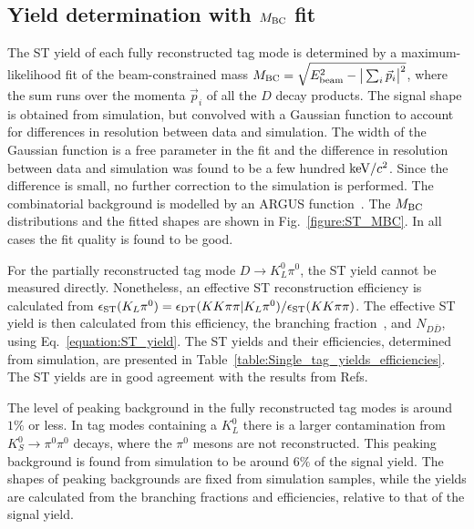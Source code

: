 \documentclass[12pt, a4paper, notitlepage, onecolumn]{article}
\begin{document}
\subsection{Yield determination with $M_{\rm BC}$ fit}
\noindent The ST yield of each fully reconstructed tag mode is determined by a maximum-likelihood fit of the beam-constrained mass $M_{\rm BC} = \sqrt{E_{\rm beam}^2 - \big\lvert\sum_i\vec{p}_i\big\rvert^2}$, where the sum runs over the momenta $\vec{p}_i$ of all the $D$ decay products. The signal shape is obtained from simulation, but convolved with a Gaussian function to account for differences in resolution between data and simulation. The width of the Gaussian function is a free parameter in the fit and the difference in resolution between data and simulation was found to be a few hundred ${\rm keV}/c^2$. Since the difference is small, no further correction to the simulation is performed. The combinatorial background is modelled by an ARGUS function~\cite{cite:Argus}. The $M_{\rm BC}$ distributions and the fitted shapes are shown in Fig.~\ref{figure:ST_MBC}. In all cases the fit quality is found to be good.

For the partially reconstructed tag mode $D\to K_L^0\pi^0$, the ST yield cannot be measured directly. Nonetheless, an effective ST reconstruction efficiency is calculated from $\epsilon_{\rm ST}(K_L\pi^0) = \epsilon_{\rm DT}(KK\pi\pi|K_L\pi^0)/\epsilon_{\rm ST}(KK\pi\pi)$. The effective ST yield is then calculated from this efficiency, the branching fraction~\cite{cite:deltaKpi}, and $N_{D\bar{D}}$, using Eq.~\eqref{equation:ST_yield}. The ST yields and their efficiencies, determined from simulation, are presented in Table~\ref{table:Single_tag_yields_efficiencies}. The ST yields are in good agreement with the results from Refs.~\cite{cite:KSpipiStrongPhase, cite:cisiKSKK, BESIII:fourpi}

The level of peaking background in the fully reconstructed tag modes is around $1\%$ or less. In tag modes containing a $K_L^0$ there is a larger contamination from $K_S^0\to\pi^0\pi^0$ decays, where the $\pi^0$ mesons are not reconstructed. This peaking background is found from simulation to be around $6\%$ of the signal yield. The shapes of peaking backgrounds are fixed from simulation samples, while the yields are calculated from the branching fractions and efficiencies, relative to that of the signal yield.
\end{document}
